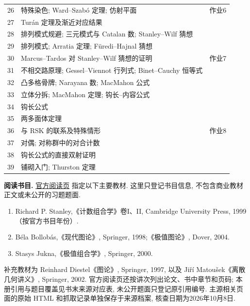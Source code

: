 \begin{longtable}{@{}p{.065\linewidth}p{.735\linewidth}p{.135\linewidth}@{}}
26 & 特殊染色; Ward--Szabó 定理; 仿射平面 & 作业6\\
27 & Turán 定理及渐近对应结果 & \\
28 & 排列模式规避; 三元模式与 Catalan 数; Stanley--Wilf 猜想 & \\
29 & 排列模式; Arratia 定理; Füredi--Hajnal 猜想 & \\
30 & Marcus--Tardos 对 Stanley--Wilf 猜想的证明 & 作业7\\
31 & 不相交路原理; Gessel--Viennot 行列式; Binet--Cauchy 恒等式 & \\
32 & 凸多格骨牌; Narayana 数; MacMahon 公式 & \\
33 & 立体分拆; MacMahon 定理; 钩长--内容公式 & \\
34 & 钩长公式 & \\
35 & 两多面体定理 & \\
36 & 与 RSK 的联系及特殊情形 & 作业8\\
37 & 对偶; 对称群中的对合计数 & \\
38 & 钩长公式的直接双射证明 & \\
39 & 铺砌入门; Thurston 定理 & \\
\end{longtable}

\noindent\textbf{阅读书目.}
\href{https://ocw.mit.edu/courses/18-315-combinatorial-theory-introduction-to-graph-theory-extremal-and-enumerative-combinatorics-spring-2005/pages/readings/}{官方阅读页}
指定以下主要教材. 这里只登记书目信息, 不包含商业教材正文或未公开的习题题面.
\begin{enumerate}
\item Richard P. Stanley,《计数组合学》卷I、II, Cambridge University Press, 1999（按官方书目年份）.
\item Béla Bollobás,《现代图论》, Springer, 1998;《极值图论》, Dover, 2004.
\item Stasys Jukna,《极值组合学》, Springer, 2000.
\end{enumerate}
补充教材为 Reinhard Diestel《图论》, Springer, 1997, 以及 Jiří Matoušek《离散几何讲义》,
Springer, 2002. 官方阅读页还按讲次列出论文、书中章节和页码;
本册引用与题目覆盖见书末来源对应表, 未公开题面只登记原引用编号.
主源相关页面的原始 HTML 和抓取记录单独保存于来源档案, 核查日期为2026年10月8日.


\clearpage
